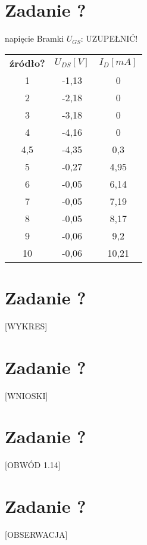 \documentclass[polish,a4paper]{article}
\begin{document}
\section{Zadanie ?}
napięcie Bramki $U_{GS}$: UZUPEŁNIĆ!


\begin{center}
\begin{tabular}{|c|c|c|}
\hline
\textbf{źródło?} & \textbf{$U_{DS} [V]$} & \textbf{$I_D [mA]$}\\
\hhline{|=|=|=|}
1 & -1,13 & 0 \\
\hline
2 & -2,18 & 0 \\
\hline
3 & -3,18 & 0 \\
\hline
4 & -4,16 & 0 \\
\hline
4,5 & -4,35 & 0,3 \\
\hline
5 & -0,27 & 4,95 \\
\hline
6 & -0,05 & 6,14 \\
\hline
7 & -0,05 & 7,19 \\
\hline
8 & -0,05 & 8,17 \\
\hline
9 & -0,06 & 9,2 \\
\hline
10 & -0,06 & 10,21 \\
\hline


\end{tabular}
\end{center}


\section{Zadanie ?}
[WYKRES]




\section{Zadanie ?}
[WNIOSKI]

\section{Zadanie ?}
[OBWÓD 1.14]

\section{Zadanie ?}
[OBSERWACJA]
\end{document}
